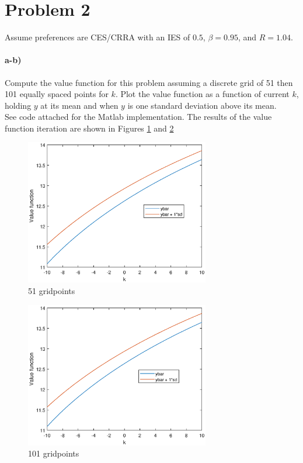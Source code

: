 \documentclass[11pt,letter]{article}
\begin{document}
\section*{Problem 2}
Assume preferences are CES/CRRA with an IES of $0.5$, $\beta = 0.95$, and $R = 1.04$. \\
\paragraph{a-b)} Compute the value function for this problem assuming a discrete grid of 51 then 101 equally spaced points for $k$. Plot the value function as a function of current $k$, holding $y$ at its mean and when $y$ is one standard deviation above its mean. \\
 
See code attached for the Matlab implementation. The results of the value function iteration are shown in Figures \ref{fig:51gridpoints} and \ref{fig:101gridpoints}


\begin{figure}[htb!]
	\centering
	\includegraphics[height=2.5in]{value_function_51_gridpoints.eps}
	\caption{51 gridpoints}
	\label{fig:51gridpoints}
\end{figure}

\begin{figure}[t!]
	\centering
	\includegraphics[height=2.5in]{value_function_101_gridpoints.eps}
	\caption{101 gridpoints}
	\label{fig:101gridpoints}
\end{figure}
\end{document}
